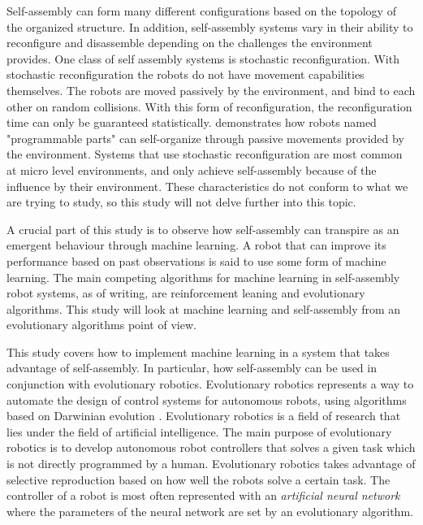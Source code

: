 Self-assembly can form many different configurations based on the topology of the organized structure.
In addition, self-assembly systems vary in their ability to reconfigure and disassemble depending on the challenges the environment provides.
One class of self assembly systems is stochastic reconfiguration. 
With stochastic reconfiguration the robots do not have movement capabilities themselves. 
The robots are moved passively by the environment, and bind to each other on random collisions\cite{gro_autonomous_2006}. 
With this form of reconfiguration, the reconfiguration time can only be guaranteed statistically\cite{yim_modular_2007}.
\cite{bishop_programmable_2005} demonstrates how robots named "programmable parts" can self-organize through passive movements provided by the environment. Systems that use stochastic reconfiguration are most common at micro level environments, and only achieve self-assembly because of the influence by their environment.
These characteristics do not conform to what we are trying to study, so this study will not delve further into this topic.

A crucial part of this study is to observe how self-assembly can transpire as an emergent behaviour through machine learning.
A robot that can improve its performance based on past observations is said to use some form of machine learning.
The main competing algorithms for machine learning in self-assembly robot systems, as of writing, are reinforcement leaning and evolutionary algorithms.
This study will look at machine learning and self-assembly from an evolutionary algorithms point of view.

This study covers how to implement machine learning in a system that takes advantage of self-assembly.
In particular, how self-assembly can be used in conjunction with evolutionary robotics.
Evolutionary robotics represents a way to automate the design of control systems for autonomous robots, using algorithms based on Darwinian evolution \cite{trianni_evolving_2004}.
Evolutionary robotics is a field of research that lies under the field of artificial intelligence. 
The main purpose of evolutionary robotics is to develop autonomous robot controllers that solves a given task which is not directly programmed by a human.
Evolutionary robotics takes advantage of selective reproduction based on how well the robots solve a certain task.
The controller of a robot is most often represented with an \emph{artificial neural network} where the parameters of the neural network are set by an evolutionary algorithm.

